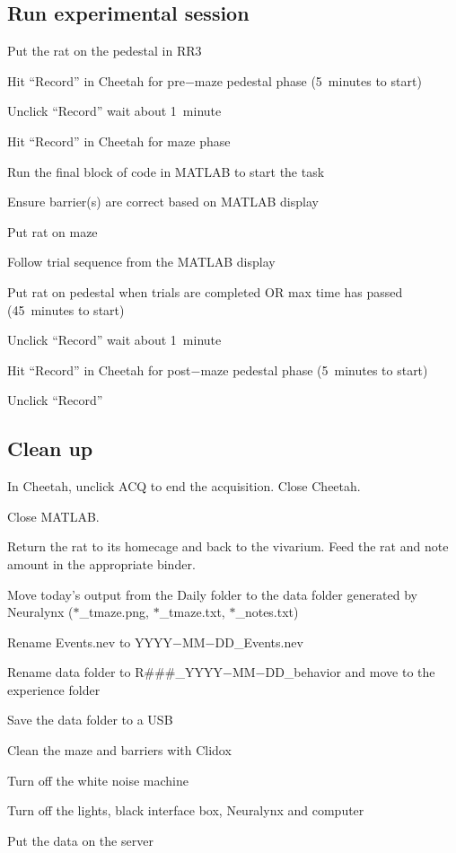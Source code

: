 \documentclass[10pt]{article}
\begin{document}
\subsection*{Run experimental session}
\begin{todolist}[topsep=0pt,itemsep=-1ex,partopsep=1ex,parsep=1ex]
\item Put the rat on the pedestal in RR3
\item Hit ``Record'' in Cheetah for pre$-$maze pedestal phase (5~minutes to start)
\item Unclick ``Record'' wait about 1~minute
\item Hit ``Record'' in Cheetah for maze phase
\item Run the final block of code in MATLAB to start the task
\item Ensure barrier(s) are correct based on MATLAB display
\item Put rat on maze
\item Follow trial sequence from the MATLAB display
\item Put rat on pedestal when trials are completed OR max time has passed (45~minutes to start)
\item Unclick ``Record'' wait about 1~minute
\item Hit ``Record'' in Cheetah for post$-$maze pedestal phase (5~minutes to start)
\item Unclick ``Record''
\end{todolist}

\subsection*{Clean up}
\begin{todolist}[topsep=0pt,itemsep=-1ex,partopsep=1ex,parsep=1ex]
\item In Cheetah, unclick ACQ to end the acquisition. Close Cheetah.
\item Close MATLAB.
\item Return the rat to its homecage and back to the vivarium. Feed the rat and note amount in the appropriate binder.
\item Move today's output from the Daily folder to the data folder generated by Neuralynx ($*$\_tmaze.png, $*$\_tmaze.txt, $*$\_notes.txt)
\item Rename Events.nev to YYYY$-$MM$-$DD\_Events.nev
\item Rename data folder to R\#\#\#\_YYYY$-$MM$-$DD\_behavior and move to the experience folder
\item Save the data folder to a USB
\item Clean the maze and barriers with Clidox
\item Turn off the white noise machine
\item Turn off the lights, black interface box, Neuralynx and computer
\item Put the data on the server 
\end{todolist}
\end{document}
